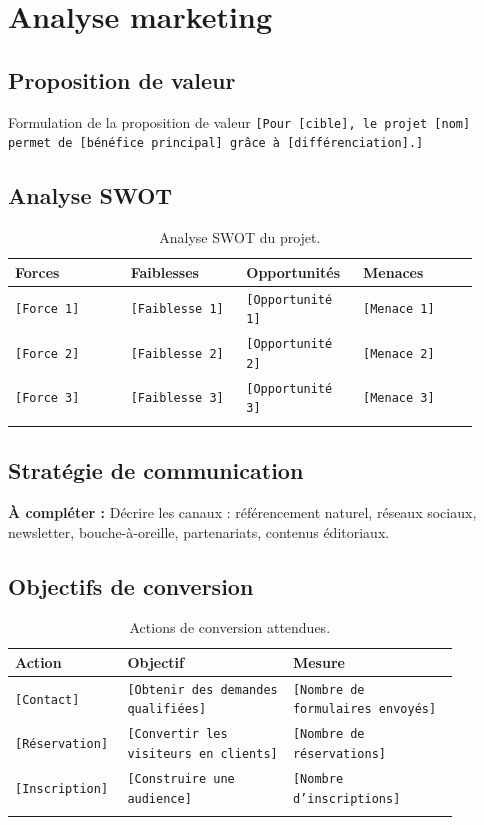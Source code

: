 \documentclass[11pt,a4paper]{report}
\newcommand{\placeholder}[1]{\textcolor{placeholderColor}{\texttt{[#1]}}}
\newcommand{\todo}[1]{\textcolor{todoColor}{\textbf{À compléter :} #1}}
\newcommand{\blankspace}[1]{\vspace*{#1}}
\begin{document}
\chapter{Analyse marketing}

\section{Proposition de valeur}
\begin{infobox}{Formulation de la proposition de valeur}
\placeholder{Pour [cible], le projet [nom] permet de [bénéfice principal] grâce à [différenciation].}
\end{infobox}
\blankspace{5cm}

\section{Analyse SWOT}
\begin{longtable}{p{0.23\linewidth}p{0.23\linewidth}p{0.23\linewidth}p{0.23\linewidth}}
\toprule
\textbf{Forces} & \textbf{Faiblesses} & \textbf{Opportunités} & \textbf{Menaces} \\
\midrule
\endhead
\placeholder{Force 1} & \placeholder{Faiblesse 1} & \placeholder{Opportunité 1} & \placeholder{Menace 1} \\
\placeholder{Force 2} & \placeholder{Faiblesse 2} & \placeholder{Opportunité 2} & \placeholder{Menace 2} \\
\placeholder{Force 3} & \placeholder{Faiblesse 3} & \placeholder{Opportunité 3} & \placeholder{Menace 3} \\
\bottomrule
\caption{Analyse SWOT du projet.}
\label{tab:swot}
\end{longtable}

\section{Stratégie de communication}
\todo{Décrire les canaux : référencement naturel, réseaux sociaux, newsletter, bouche-à-oreille, partenariats, contenus éditoriaux.}
\blankspace{6cm}

\section{Objectifs de conversion}
\begin{longtable}{p{0.18\linewidth}p{0.35\linewidth}p{0.35\linewidth}}
\toprule
\textbf{Action} & \textbf{Objectif} & \textbf{Mesure} \\
\midrule
\endhead
\placeholder{Contact} & \placeholder{Obtenir des demandes qualifiées} & \placeholder{Nombre de formulaires envoyés} \\
\placeholder{Réservation} & \placeholder{Convertir les visiteurs en clients} & \placeholder{Nombre de réservations} \\
\placeholder{Inscription} & \placeholder{Construire une audience} & \placeholder{Nombre d'inscriptions} \\
\bottomrule
\caption{Actions de conversion attendues.}
\label{tab:conversion}
\end{longtable}
\end{document}
